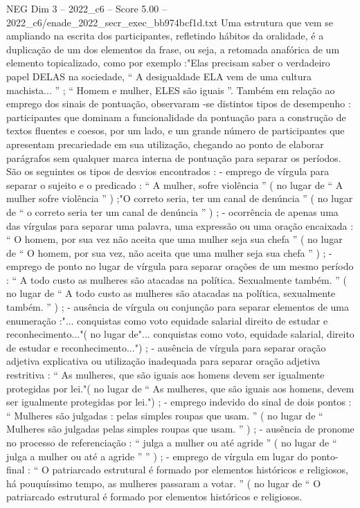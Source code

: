 \begin{textsample}{NEG Dim 3 – 2022\_c6 – Score 5.00 – 2022\_c6/enade\_2022\_secr\_exec\_bb974bcf1d.txt}
Uma estrutura que vem se ampliando na escrita dos participantes, refletindo hábitos da oralidade, é a duplicação de um dos elementos da frase, ou seja, a retomada anafórica de um elemento topicalizado, como por exemplo :"Elas precisam saber o verdadeiro papel DELAS na sociedade, “ A desigualdade ELA vem de uma cultura machista... ” ; “ Homem e mulher, ELES são iguais ”.
Também em relação ao emprego dos sinais de pontuação, observaram -se distintos tipos de desempenho : participantes que dominam a funcionalidade da pontuação para a construção de textos fluentes e coesos, por um lado, e um grande número de participantes que apresentam precariedade em sua utilização, chegando ao ponto de elaborar parágrafos sem qualquer marca interna de pontuação para separar os períodos.
São os seguintes os tipos de desvios encontrados : - emprego de vírgula para separar o sujeito e o predicado : “ A mulher, sofre violência ” ( no lugar de “ A mulher sofre violência ” ) ;"O correto seria, ter um canal de denúncia ” ( no lugar de “ o correto seria ter um canal de denúncia ” ) ; - ocorrência de apenas uma das vírgulas para separar uma palavra, uma expressão ou uma oração encaixada : “ O homem, por sua vez não aceita que uma mulher seja sua chefa ” ( no lugar de “ O homem, por sua vez, não aceita que uma mulher seja sua chefa ” ) ; - emprego de ponto no lugar de vírgula para separar orações de um mesmo período : “ A todo custo as mulheres são atacadas na política.
Sexualmente também. ” ( no lugar de “ A todo custo as mulheres são atacadas na política, sexualmente também. ” ) ; - ausência de vírgula ou conjunção para separar elementos de uma enumeração :"... conquistas como voto equidade salarial direito de estudar e reconhecimento..."( no lugar de"... conquistas como voto, equidade salarial, direito de estudar e reconhecimento...") ; - ausência de vírgula para separar oração adjetiva explicativa ou utilização inadequada para separar oração adjetiva restritiva : “ As mulheres, que são iguais aos homens devem ser igualmente protegidas por lei."( no lugar de “ As mulheres, que são iguais aos homens, devem ser igualmente protegidas por lei.") ; - emprego indevido do sinal de dois pontos : “ Mulheres são julgadas : pelas simples roupas que usam. ” ( no lugar de “ Mulheres são julgadas pelas simples roupas que usam. ” ) ; - ausência de pronome no processo de referenciação : “ julga a mulher ou até agride ” ( no lugar de “ julga a mulher ou até a agride ” ” ) ; - emprego de vírgula em lugar do ponto-final : “ O patriarcado estrutural é formado por elementos históricos e religiosos, há pouquíssimo tempo, as mulheres passaram a votar. ” ( no lugar de “ O patriarcado estrutural é formado por elementos históricos e religiosos.

\end{textsample}

